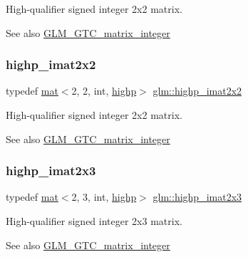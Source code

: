 High-\/qualifier signed integer 2x2 matrix. \begin{DoxySeeAlso}{See also}
\hyperlink{group__gtc__matrix__integer}{G\+L\+M\+\_\+\+G\+T\+C\+\_\+matrix\+\_\+integer} 
\end{DoxySeeAlso}
\mbox{\label{group__gtc__matrix__integer_ga9d5c6c5a4640f7c794a77e3f60b91670}} 
\subsubsection{\texorpdfstring{highp\+\_\+imat2x2}{highp\_imat2x2}}
{\footnotesize\ttfamily typedef \hyperlink{structglm_1_1mat}{mat}$<$2, 2, int, \hyperlink{namespaceglm_a36ed105b07c7746804d7fdc7cc90ff25ac6f7eab42eacbb10d59a58e95e362074}{highp}$>$ \hyperlink{group__gtc__matrix__integer_ga9d5c6c5a4640f7c794a77e3f60b91670}{glm\+::highp\+\_\+imat2x2}}

High-\/qualifier signed integer 2x2 matrix. \begin{DoxySeeAlso}{See also}
\hyperlink{group__gtc__matrix__integer}{G\+L\+M\+\_\+\+G\+T\+C\+\_\+matrix\+\_\+integer} 
\end{DoxySeeAlso}
\mbox{\label{group__gtc__matrix__integer_ga6bf015d7d01115e1d71362f2aa1cd3c4}} 
\subsubsection{\texorpdfstring{highp\+\_\+imat2x3}{highp\_imat2x3}}
{\footnotesize\ttfamily typedef \hyperlink{structglm_1_1mat}{mat}$<$2, 3, int, \hyperlink{namespaceglm_a36ed105b07c7746804d7fdc7cc90ff25ac6f7eab42eacbb10d59a58e95e362074}{highp}$>$ \hyperlink{group__gtc__matrix__integer_ga6bf015d7d01115e1d71362f2aa1cd3c4}{glm\+::highp\+\_\+imat2x3}}

High-\/qualifier signed integer 2x3 matrix. \begin{DoxySeeAlso}{See also}
\hyperlink{group__gtc__matrix__integer}{G\+L\+M\+\_\+\+G\+T\+C\+\_\+matrix\+\_\+integer} 
\end{DoxySeeAlso}
\mbox{\label{group__gtc__matrix__integer_ga5e3a9d05895fbefef19c051e60ca81c4}} 

